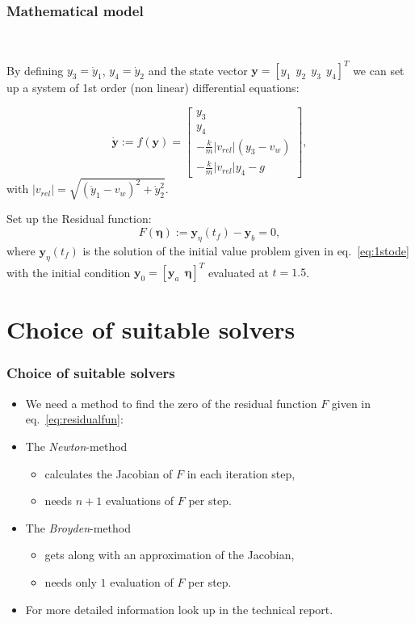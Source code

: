 \documentclass{beamer}
\begin{document}
		\begin{frame}
			\frametitle{Mathematical model}
					~	
			 
			By defining $y_3 = \dot{y}_1$, $y_4 = \dot{y}_2$ and the state vector $\boldsymbol{y} = [y_1~~ y_2~~ y_3~~ y_4]^T$ we can set up a system of 1st order (non linear) differential equations:
			
			\begin{equation}
			\dot{\boldsymbol{y}}
			:=  f(\boldsymbol{y}) = 
			\begin{bmatrix}
			y_3 \\ y_4 \\
			-\frac{k}{m}|v_{rel}|\left(y_3-v_w\right)\\
			-\frac{k}{m}|v_{rel}|{y_4} - g
			\end{bmatrix},
			\label{eq:1stode}
			\end{equation}	
			with $|v_{rel}| = \sqrt{\left( \dot{y}_1 -v_w \right)^2 + \dot{y}_2^2}$.		
			
			
		 	Set up the Residual function: 
		 	\begin{equation}
		 	F(\boldsymbol{\eta}) := \boldsymbol{y}_\eta(t_f)-\boldsymbol{y}_b = 0,
		 	\label{eq:residualfun}
		 	\end{equation}
		 	 where $\boldsymbol{y}_\eta(t_f)$ is the solution of the initial value problem given in eq.~\ref{eq:1stode} with the initial condition $\boldsymbol{y}_0 = [\boldsymbol{y}_a ~~ \boldsymbol{\eta}]^T$ evaluated at $t = 1.5$.
			
			
		\end{frame}

	\section{Choice of suitable solvers}
		\begin{frame}
			\frametitle{Choice of suitable solvers}
			\begin{itemize}
			\item We need a method to find the zero of the residual function $F$ given in eq.~\ref{eq:residualfun}:
			\item The \textit{Newton}-method
				\begin{itemize}
					\item calculates the Jacobian of $F$ in each iteration step,
					\item needs $n+1$ evaluations of $F$ per step.
				\end{itemize}
			\item The \textit{Broyden}-method
				\begin{itemize}
					\item gets along with an approximation of the Jacobian,
					\item needs only $1$ evaluation of $F$ per step.
				\end{itemize}
			\item For more detailed information look up in the technical report.
			\end{itemize}
		\end{frame}
\end{document}
